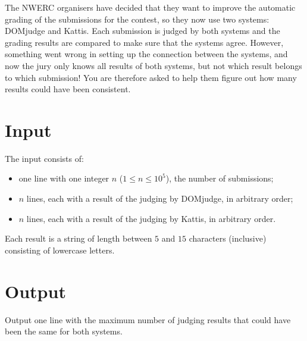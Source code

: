 
%
\noindent
The NWERC organisers have decided that they want to improve the automatic grading of the submissions for the contest, so they now use two systems: DOMjudge and Kattis. Each submission is judged by both systems and the grading results are compared to make sure that the systems agree. However, something went wrong in setting up the connection between the systems, and now the jury only knows all results of both systems, but not which result belongs to which submission! You are therefore asked to help them figure out how many results could have been consistent. 

\section*{Input}

The input consists of:
\begin{itemize}
   \item one line with one integer $n$ ($1\leq n \leq 10^5$), the number of submissions;
   \item $n$ lines, each with a result of the judging by DOMjudge, in arbitrary order;
   \item $n$ lines, each with a result of the judging by Kattis, in arbitrary order.
\end{itemize}
Each result is a string of length between $5$ and $15$ characters (inclusive) consisting of lowercase letters.

\section*{Output}

Output one line with the maximum number of judging results that could have been the same for both systems.
